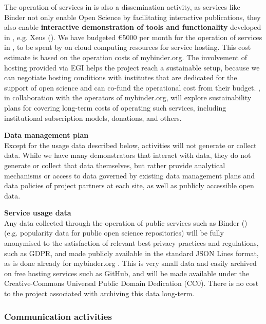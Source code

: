 The operation of services in  is also a dissemination activity,
as services like Binder not only enable Open Science by facilitating interactive publications,
they also enable \textbf{interactive demonstration of tools and functionality}
developed in \TheProject, e.g. Xeus ().
We have budgeted \euro 5000 per month for the operation of services in ,
to be spent by  on cloud computing resources for service hosting.
This cost estimate is based on the operation costs of mybinder.org.
The involvement of hosting provided via EGI helps the project reach a sustainable setup, 
because we can negotiate hosting conditions with institutes that are dedicated for the support of 
open science and can co-fund the operational cost from their budget.
\TheProject, in collaboration with the operators of mybinder.org,
will explore sustainability plans for covering long-term costs of operating such services,
including institutional subscription models, donations, and others.

\medskip
\noindent \textbf{Data management plan}\label{sec:data-management-plan}\\
Except for the usage data described below,
\TheProject activities will not generate or collect data.
While we have many demonstrators that interact with data, they do not generate or collect that 
data themselves, but rather provide analytical mechanisms or access to data governed by 
existing data management plans and data policies of project partners at each site,
as well as publicly accessible open data.


\noindent \textbf{Service usage data} \\
Any data collected through the operation of public services such as Binder ()
(e.g. popularity data for public open science repositories)
will be fully anonymised to the satisfaction of relevant best privacy practices and regulations, such as GDPR,
and made publicly available in the standard JSON Lines format,
as is done already for mybinder.org \cite{mybinder-archive}.
This is very small data and easily archived on free hosting services such as GitHub,
and will be made available under the Creative-Commons Universal Public Domain Dedication (CC0).
There is no cost to the project associated with archiving this data long-term.

\subsubsection{Communication activities}

